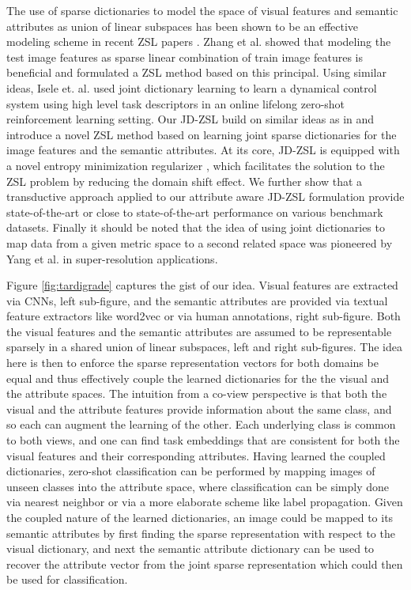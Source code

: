 \documentclass[letterpaper]{article} %
\begin{document}
The use of sparse dictionaries to model the space of visual features and semantic attributes as union of linear subspaces has  been shown to be an effective modeling scheme in recent ZSL papers \cite{yu2017transductive,isele2016using,kodirov2015unsupervised,zhang2015zero}.  Zhang et al. \cite{zhang2015zero} showed that modeling the test image features as sparse linear combination of train image features is beneficial and formulated a ZSL method based on this principal. Using similar ideas, Isele et. al. \cite{isele2016using} used joint dictionary learning to learn a dynamical control system using high level task descriptors in an online lifelong zero-shot reinforcement learning setting.  Our JD-ZSL build on similar ideas as in \cite{yu2017transductive,isele2016using,kodirov2015unsupervised} and introduce a novel ZSL method based on learning joint sparse dictionaries for the image features and the semantic attributes. At its core, JD-ZSL is equipped with a novel entropy minimization regularizer \cite{grandvalet2004semi}, which facilitates the solution to the ZSL problem by reducing the domain shift effect. We further show that a transductive approach applied to our attribute aware JD-ZSL formulation provide state-of-the-art or close to state-of-the-art performance on various benchmark datasets. Finally it should be noted that the idea of using joint dictionaries to map data from a given metric space to a second related  space was pioneered by Yang et al.  \cite{yang2010image} in super-resolution applications.  

Figure \ref{fig:tardigrade} captures the gist of our idea. Visual features are extracted via CNNs, left sub-figure, and the semantic attributes are provided via textual feature extractors like word2vec or via human annotations, right sub-figure.  Both the visual features and the semantic attributes are assumed to be representable sparsely in a shared union of linear subspaces, left and right sub-figures. The idea here is then to enforce the sparse representation vectors for both domains be equal and thus  effectively couple the learned dictionaries for the the visual and the attribute spaces.  
 The intuition from  a co-view  perspective \cite{yu2014discriminative} is that both the visual and the attribute features provide information about the same class, and so each can augment the learning of the other. Each underlying class is common to both views, and one can find task embeddings that are consistent for both the visual features   and their corresponding attributes. Having learned the coupled dictionaries,   zero-shot classification can be performed by mapping images of unseen classes into the attribute space, where classification can be simply done via nearest neighbor or via a more elaborate scheme like label propagation. Given the coupled nature of the learned dictionaries, an image could be mapped to its semantic attributes by first finding the sparse representation with respect to the visual dictionary, and next  the semantic attribute dictionary can be used to recover the attribute  vector from the joint sparse representation which could then be used for classification. 
 
\end{document}
